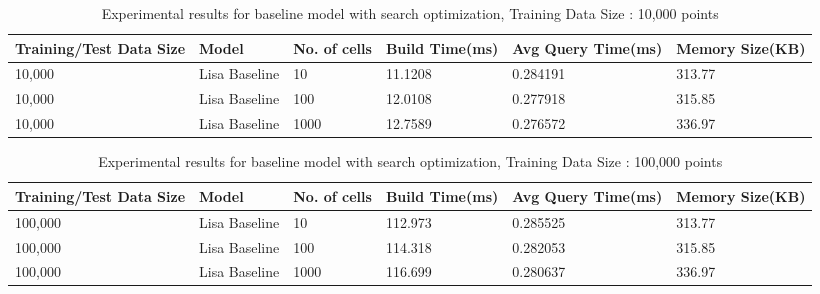\begin{table}[ht]
	\centering
	\begin{tabular}{||p{}<{\centering}|p{}<{\centering}| p{}<{\centering}|p{}<{\centering}|p{}<{\centering}|p{}<{\centering}||}
		\hline
		Training/Test Data Size& Model & No. of cells & Build Time(ms) & Avg Query Time(ms) & Memory Size(KB)\\ [0.5ex] 
		\hline
		\hline
		10,000& Lisa Baseline & 10 & 11.1208 & 0.284191 & 313.77\\
		\hline
		10,000& Lisa Baseline & 100 & 12.0108 & 0.277918 & 315.85\\
		\hline
		10,000& Lisa Baseline & 1000 & 12.7589 & 0.276572 & 336.97\\
		\hline
		\hline
	\end{tabular}
	\label{baseline_search_optimization}
	\caption{Experimental results for baseline model with search optimization, Training Data Size : 10,000 points}
\end{table}

\begin{table}[ht]
	\centering
	\begin{tabular}{||p{}<{\centering}|p{}<{\centering}| p{}<{\centering}|p{}<{\centering}|p{}<{\centering}|p{}<{\centering}||}
		\hline
		Training/Test Data Size& Model & No. of cells & Build Time(ms) & Avg Query Time(ms) & Memory Size(KB)\\ [0.5ex] 
		\hline
		\hline
		100,000& Lisa Baseline & 10 & 112.973 & 0.285525 & 313.77\\
		\hline
		100,000& Lisa Baseline & 100 & 114.318 & 0.282053 & 315.85\\
		\hline
		100,000& Lisa Baseline & 1000 & 116.699 & 0.280637 & 336.97\\
		\hline
		\hline
	\end{tabular}
	\label{baseline_search_optimization}
	\caption{Experimental results for baseline model with search optimization, Training Data Size : 100,000 points}
\end{table}

